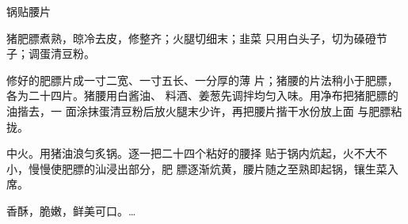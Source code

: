 \begin{recipe}{锅贴腰片}

\ingredients


\cooking

\step 猪肥膘煮熟，晾冷去皮，修整齐；火腿切细末；韭菜 只用白头子，切为磉磴节子；调蛋清豆粉。

\step 修好的肥膘片成一寸二宽、一寸五长、一分厚的薄 片；猪腰的片法稍小于肥膘，各为二十四片。猪腰用白酱油、 料酒、姜葱先调拌均匀入味。用净布把猪肥膘的油揩去，一 面涂抹蛋清豆粉后放火腿末少许，再把腰片揩干水份放上面 与肥膘粘拢。

\step 中火。用猪油浪匀炙锅。逐一把二十四个粘好的腰择 贴于锅内炕起，火不大不小，慢慢使肥膘的汕浸出部分，肥 膘逐渐炕黄，腰片随之至熟即起锅，镶生菜入席。

\notes

香酥，脆嫩，鲜美可口。…

\end{recipe}

